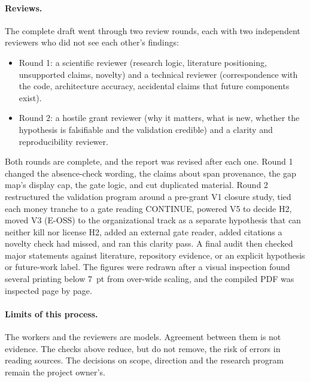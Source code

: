 \paragraph{Reviews.} The complete draft went through two review rounds, each
with two independent reviewers who did not see each other's findings:
\begin{itemize}[nosep]
  \item Round 1: a scientific reviewer (research logic, literature
    positioning, unsupported claims, novelty) and a technical reviewer
    (correspondence with the code, architecture accuracy, accidental claims
    that future components exist).
  \item Round 2: a hostile grant reviewer (why it matters, what is new,
    whether the hypothesis is falsifiable and the validation credible) and a
    clarity and reproducibility reviewer.
\end{itemize}
Both rounds are complete, and the report was revised after each one. Round 1 changed the
absence-check wording, the claims about span provenance, the gap map's display cap, the gate
logic, and cut duplicated material. Round 2 restructured the validation program around a
pre-grant V1 closure study, tied each money tranche to a gate reading CONTINUE, powered V5 to
decide H2, moved V3 (E-OSS) to the organizational track as a separate hypothesis that can neither
kill nor license H2, added an external gate reader, added citations a novelty check had missed,
and ran this clarity pass. A final audit then checked major statements against literature,
repository evidence, or an explicit hypothesis or future-work label. The figures were redrawn
after a visual inspection found several printing below 7~pt from over-wide scaling, and the
compiled PDF was inspected page by page.

\paragraph{Limits of this process.} The workers and the reviewers are
models. Agreement between them is not evidence. The checks above reduce, but
do not remove, the risk of errors in reading sources. The decisions on scope,
direction and the research program remain the project owner's.
